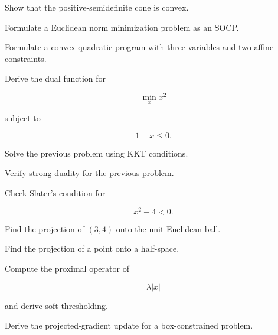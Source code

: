 \begin{exercise}[3]
Show that the positive-semidefinite cone is convex.
\end{exercise}

\begin{exercise}[3]
Formulate a Euclidean norm minimization problem as an SOCP.
\end{exercise}

\begin{exercise}[3]
Formulate a convex quadratic program with three variables and two affine
constraints.
\end{exercise}

\begin{exercise}[3]
Derive the dual function for

\[
\min_x x^2
\]

subject to

\[
1-x\leq0.
\]
\end{exercise}

\begin{exercise}[3]
Solve the previous problem using KKT conditions.
\end{exercise}

\begin{exercise}[3]
Verify strong duality for the previous problem.
\end{exercise}

\begin{exercise}[3]
Check Slater's condition for

\[
x^2-4<0.
\]
\end{exercise}

\begin{exercise}[3]
Find the projection of \((3,4)\) onto the unit Euclidean ball.
\end{exercise}

\begin{exercise}[3]
Find the projection of a point onto a half-space.
\end{exercise}

\begin{exercise}[3]
Compute the proximal operator of

\[
\lambda|x|
\]

and derive soft thresholding.
\end{exercise}

\begin{exercise}[3]
Derive the projected-gradient update for a box-constrained problem.
\end{exercise}

